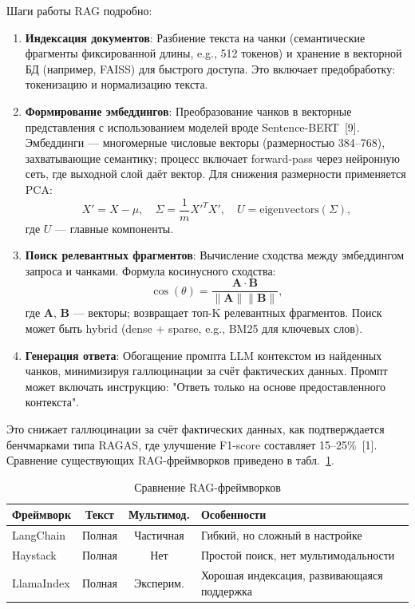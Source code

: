 \documentclass[a4paper,12pt]{article}
\begin{document}
Шаги работы RAG подробно:
\begin{enumerate}
    \item \textbf{Индексация документов}: Разбиение текста на чанки (семантические фрагменты фиксированной длины, e.g., 512 токенов) и хранение в векторной БД (например, FAISS) для быстрого доступа. Это включает предобработку: токенизацию и нормализацию текста.
    \item \textbf{Формирование эмбеддингов}: Преобразование чанков в векторные представления с использованием моделей вроде Sentence-BERT~[9]. Эмбеддинги --- многомерные числовые векторы (размерностью 384--768), захватывающие семантику; процесс включает forward-pass через нейронную сеть, где выходной слой даёт вектор. Для снижения размерности применяется PCA: 
    \[
    X' = X - \mu, \quad \Sigma = \frac{1}{m} X'^T X', \quad U = \text{eigenvectors}(\Sigma),
    \]
    где $U$ --- главные компоненты.
    \item \textbf{Поиск релевантных фрагментов}: Вычисление сходства между эмбеддингом запроса и чанками. Формула косинусного сходства:
    \[
    \cos(\theta) = \frac{\mathbf{A} \cdot \mathbf{B}}{\|\mathbf{A}\| \|\mathbf{B}\|},
    \]
    где $\mathbf{A}$, $\mathbf{B}$ --- векторы; возвращает топ-K релевантных фрагментов. Поиск может быть hybrid (dense + sparse, e.g., BM25 для ключевых слов).
    \item \textbf{Генерация ответа}: Обогащение промпта LLM контекстом из найденных чанков, минимизируя галлюцинации за счёт фактических данных. Промпт может включать инструкцию: "Ответь только на основе предоставленного контекста".
\end{enumerate}

Это снижает галлюцинации за счёт фактических данных, как подтверждается бенчмарками типа RAGAS, где улучшение F1-score составляет 15--25\%~[1]. Сравнение существующих RAG-фреймворков приведено в табл.~\ref{tab:rag-frameworks-ch1}.

\begin{table}[H]
    \centering
    \caption{Сравнение RAG-фреймворков}
    \label{tab:rag-frameworks-ch1}
    \begin{tabularx}{\textwidth}{|l|c|c|X|}
        \hline
        \textbf{Фреймворк} & \textbf{Текст} & \textbf{Мультимод.} & \textbf{Особенности} \\
        \hline
        LangChain & Полная & Частичная & Гибкий, но сложный в настройке \\
        \hline
        Haystack & Полная & Нет & Простой поиск, нет мультимодальности \\
        \hline
        LlamaIndex & Полная & Эксперим. & Хорошая индексация, развивающаяся поддержка \\
        \hline
    \end{tabularx}
\end{table}
\end{document}
